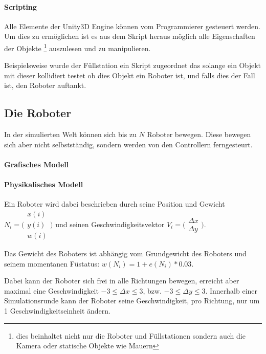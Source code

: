 \documentclass[
    12pt,
    bibliography=totoc,
    ngerman
]{scrartcl}
\begin{document}
\paragraph{Scripting}
Alle Elemente der Unity3D Engine k{\"{o}}nnen vom Programmierer gesteuert werden. Um dies zu erm{\"{o}}glichen ist es aus dem Skript heraus m{\"{o}}glich alle Eigenschaften
der Objekte \footnote{dies beinhaltet nicht nur die Roboter und F{\"{u}}llstationen sondern auch die Kamera oder statische Objekte wie Mauern} auszulesen und zu manipulieren.

Beispielsweise wurde der F{\"{u}}llstation ein Skript zugeordnet das solange ein Objekt mit dieser kollidiert testet ob dies Objekt ein Roboter ist, und falls dies der Fall ist,
den Roboter auftankt.

\subsection{Die Roboter}\label{robot}
In der simulierten Welt k{\"{o}}nnen sich bis zu $N$ Roboter bewegen. Diese bewegen sich aber nicht selbstst{\"{a}}ndig, sondern werden von den Controllern ferngesteurt.
\paragraph{Grafisches Modell} 

\paragraph{Physikalisches Modell}
Ein Roboter wird dabei beschrieben durch seine Position und Gewicht
$ N_i = \bigl(\begin{smallmatrix} x(i) \\ y(i) \\ w(i) \end{smallmatrix}\bigr)$ und
seinen Geschwindigkeitsvektor
$ V_i = \bigl(\begin{smallmatrix} \Delta x \\ \Delta y \end{smallmatrix}\bigr)$.

Das Gewicht des Roboters ist abh{\"{a}}ngig vom Grundgewicht des Roboters und seinem momentanen F{\"{u}}status: $ w(N_i) = 1 + e(N_i) * 0.03 $.

Dabei kann der Roboter sich frei in alle Richtungen bewegen, erreicht aber
maximal eine Geschwindigkeit $ -3 \leq \Delta x \leq 3$, bzw. 
$ -3 \leq \Delta y \leq 3$.
Innerhalb einer Simulationsrunde kann der Roboter seine Geschwindigkeit, pro
Richtung, nur um 1 Geschwindigkeitseinheit {\"{a}}ndern.
\end{document}
